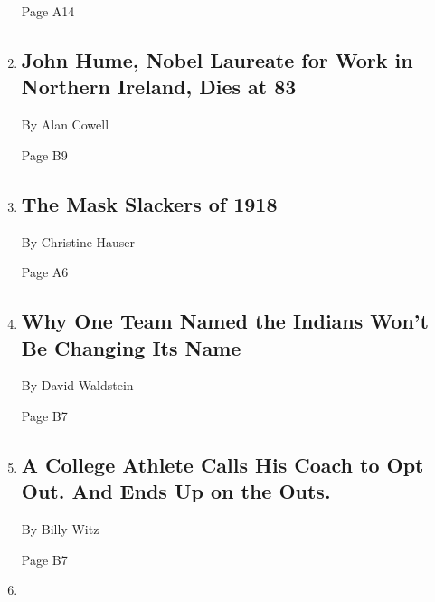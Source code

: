 \begin{enumerate}
  Page A14
\item
  \href{/2020/08/03/obituaries/john-hume-dies.html}{}

  \hypertarget{john-hume-nobel-laureate-for-work-in-northern-ireland-dies-at-83}{%
  \subsection{John Hume, Nobel Laureate for Work in Northern Ireland,
  Dies at
  83}\label{john-hume-nobel-laureate-for-work-in-northern-ireland-dies-at-83}}

  By Alan Cowell

  Page B9
\item
  \href{/2020/08/03/us/mask-protests-1918.html}{}

  \hypertarget{the-mask-slackers-of-1918}{%
  \subsection{The Mask Slackers of
  1918}\label{the-mask-slackers-of-1918}}

  By Christine Hauser

  Page A6
\item
  \href{/2020/08/03/sports/baseball/indians-team-names-mascots.html}{}

  \hypertarget{why-one-team-named-the-indians-wont-be-changing-its-name}{%
  \subsection{Why One Team Named the Indians Won't Be Changing Its
  Name}\label{why-one-team-named-the-indians-wont-be-changing-its-name}}

  By David Waldstein

  Page B7
\item
  \href{/2020/08/03/sports/coronavirus-college-athletes-opt-out.html}{}

  \hypertarget{a-college-athlete-calls-his-coach-to-opt-out-and-ends-up-on-the-outs}{%
  \subsection{A College Athlete Calls His Coach to Opt Out. And Ends Up
  on the
  Outs.}\label{a-college-athlete-calls-his-coach-to-opt-out-and-ends-up-on-the-outs}}

  By Billy Witz

  Page B7
\item
  \href{/2020/08/03/technology/fawkes-tool-protects-photos-from-facial-recognition.html}{}


\end{enumerate}
